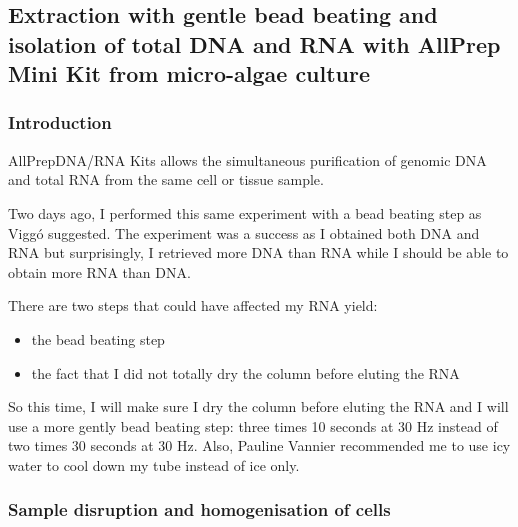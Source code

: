 \subsection{Extraction with gentle bead beating and isolation of total DNA and RNA with  AllPrep Mini Kit from micro-algae culture}
\label{task:20180301_cj0}

\subsubsection{Introduction}

AllPrep\cR DNA/RNA Kits allows the simultaneous purification of genomic DNA and total RNA from the same cell or tissue sample.

Two days ago, I performed this same experiment with a bead beating step as Viggó suggested. The experiment was a success as I obtained both DNA and RNA but surprisingly, I retrieved more DNA than RNA while I should be able to obtain more RNA than DNA.

There are two steps that could have affected my RNA yield:
\begin{itemize}
\item the bead beating step
\item the fact that I did not totally dry the column before eluting the RNA
\end{itemize}

So this time, I will make sure I dry the column before eluting the RNA and I will use a more gently bead beating step: three times 10 seconds at 30 Hz instead of two times 30 seconds at 30 Hz. Also, Pauline Vannier recommended me to use icy water to cool down my tube instead of ice only. 


\subsubsection{Sample disruption and homogenisation of cells}

